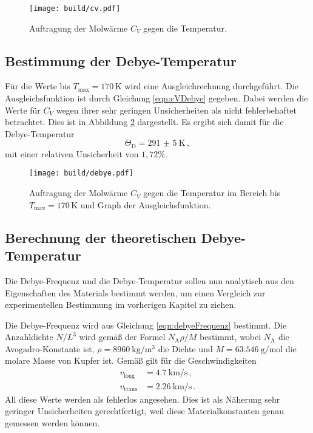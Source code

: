 \begin{figure}
  \centering
  \texttt{[image: build/cv.pdf]}
  \caption{Auftragung der Molwärme $C_V$ gegen die Temperatur.}
  \label{fig:cv}
\end{figure}

\subsection{Bestimmung der Debye-Temperatur}
\label{subsec:debye}

Für die Werte bis $T_{\text{max}}=170$\,K wird eine Ausgleichrechnung durchgeführt. Die Ausgleichsfunktion ist durch Gleichung \eqref{eqn:cVDebye} gegeben.
Dabei werden die Werte für $C_V$ wegen ihrer sehr geringen Unsicherheiten als nicht fehlerbehaftet betrachtet. Dies ist in Abbildung \ref{fig:debye} dargestellt. Es ergibt sich damit für die Debye-Temperatur
\begin{equation*}
  \Theta_\text{D}=\SI{291(5)}{\kelvin} \,,
\end{equation*}
mit einer relativen Unsicherheit von $1{,}72\%$.

\begin{figure}
  \centering
  \texttt{[image: build/debye.pdf]}
  \caption{Auftragung der Molwärme $C_V$ gegen die Temperatur im Bereich bis
  $T_{\text{max}}=170$\,K und Graph der Ausgleichsfunktion.}
  \label{fig:debye}
\end{figure}

\subsection{Berechnung der theoretischen Debye-Temperatur}
\label{subsec:debyetheo}

Die Debye-Frequenz und die Debye-Temperatur sollen nun analytisch aus den Eigenschaften des Materials bestimmt werden, um einen Vergleich zur experimentellen Bestimmung im vorherigen Kapitel zu ziehen.

Die Debye-Frequenz wird aus Gleichung \eqref{eqn:debyeFrequenz} bestimmt.
Die Anzahldichte $N/L^3$ wird gemäß der Formel $N_\text{A} \rho / M$ bestimmt, wobei $N_\text{A}$ die Avogadro-Konstante ist,
$\rho = \SI{8960}{\kilo\gram\per\cubic\meter}$ \cite{density} die Dichte und $M = \SI{63.546}{\gram\per\mole}$ \cite{Molmasse} die molare Masse von Kupfer ist.
Gemäß \cite{versuchsanleitung} gilt für die Geschwindigkeiten
\begin{align*}
  v_{\text{long}}&= \SI{4.7}{\kilo\metre\per\second} \,,\\
  v_{\text{trans}}&=\SI{2.26}{\kilo\metre\per\second} \,.
\end{align*}
All diese Werte werden als fehlerlos angesehen. Dies ist als Näherung sehr geringer Unsicherheiten gerechtfertigt, weil diese Materialkonstanten genau gemessen werden können.

